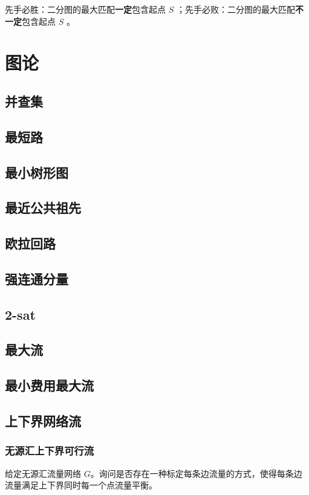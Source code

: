 \documentclass{article}
\begin{document}
先手必胜：二分图的最大匹配\textbf{一定}包含起点 $S$ ；先手必败：二分图的最大匹配\textbf{不一定}包含起点 $S$ 。

\section{图论}
\subsection{并查集}

\subsection{最短路}

\subsection{最小树形图}

\subsection{最近公共祖先}

\subsection{欧拉回路}

\subsection{强连通分量}

\subsection{2-sat}

\subsection{最大流}

\subsection{最小费用最大流}

\subsection{上下界网络流}
\subsubsection{无源汇上下界可行流}
给定无源汇流量网络 $G$。询问是否存在一种标定每条边流量的方式，使得每条边流量满足上下界同时每一个点流量平衡。
\end{document}

